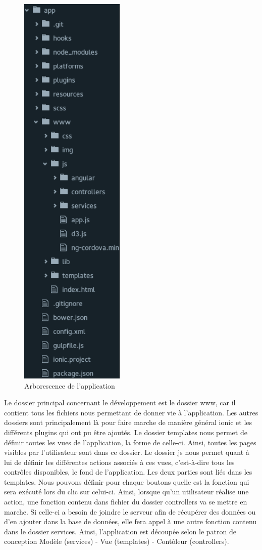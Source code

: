 \documentclass[pidr]{tnreport}
\begin{document}
\begin{figure}
  \centering
  \includegraphics[width=5cm]{figures/tree_app}
  \caption{Arborescence de l'application}
  \label{fig:tree-app}
\end{figure}

\newpage
Le dossier principal concernant le développement est le dossier www, car il contient tous les fichiers nous permettant de donner vie à l’application. Les autres dossiers sont principalement là pour faire marche de manière général ionic et les différents plugins qui ont pu être ajoutés. Le dossier templates nous permet de définir toutes les vues de l’application, la forme de celle-ci. Ainsi, toutes les pages visibles par l’utilisateur sont dans ce dossier. Le dossier js nous permet quant à lui de définir les différentes actions associés à ces vues, c’est-à-dire tous les contrôles disponibles, le fond de l’application. Les deux parties sont liés dans les templates. Nous pouvons définir pour chaque boutons quelle est la fonction qui sera exécuté lors du clic sur celui-ci. Ainsi, lorsque qu’un utilisateur réalise une action, une fonction contenu dans fichier du dossier controllers va se mettre en marche. Si celle-ci a besoin de joindre le serveur afin de récupérer des données ou d’en ajouter dans la base de données, elle fera appel à une autre fonction contenu dans le dossier services. Ainsi, l’application est découpée selon le patron de conception Modèle (services) - Vue (templates) - Contôleur (controllers).
\end{document}
